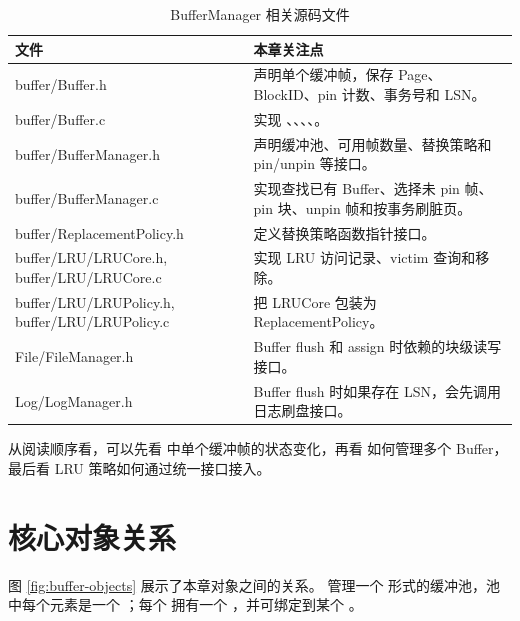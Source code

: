 \begin{table}[htbp]
  \centering
  \caption{BufferManager 相关源码文件}
  \label{tab:buffer-source-files}
  \begin{tabularx}{\textwidth}{>{\ttfamily}l Y}
    \toprule
    文件 & 本章关注点 \\
    \midrule
    buffer/Buffer.h & 声明单个缓冲帧，保存 Page、BlockID、pin 计数、事务号和 LSN。\\
    buffer/Buffer.c & 实现 、、、、。\\
    buffer/BufferManager.h & 声明缓冲池、可用帧数量、替换策略和 pin/unpin 等接口。\\
    buffer/BufferManager.c & 实现查找已有 Buffer、选择未 pin 帧、pin 块、unpin 帧和按事务刷脏页。\\
    buffer/ReplacementPolicy.h & 定义替换策略函数指针接口。\\
    buffer/LRU/LRUCore.h, buffer/LRU/LRUCore.c & 实现 LRU 访问记录、victim 查询和移除。\\
    buffer/LRU/LRUPolicy.h, buffer/LRU/LRUPolicy.c & 把 LRUCore 包装为 ReplacementPolicy。\\
    File/FileManager.h & Buffer flush 和 assign 时依赖的块级读写接口。\\
    Log/LogManager.h & Buffer flush 时如果存在 LSN，会先调用日志刷盘接口。\\
    \bottomrule
  \end{tabularx}
\end{table}

从阅读顺序看，可以先看  中单个缓冲帧的状态变化，再看  如何管理多个 Buffer，最后看 LRU 策略如何通过统一接口接入。

\section{核心对象关系}
\label{sec:buffer-objects}

图 \ref{fig:buffer-objects} 展示了本章对象之间的关系。 管理一个  形式的缓冲池，池中每个元素是一个 ；每个  拥有一个 ，并可绑定到某个 。

